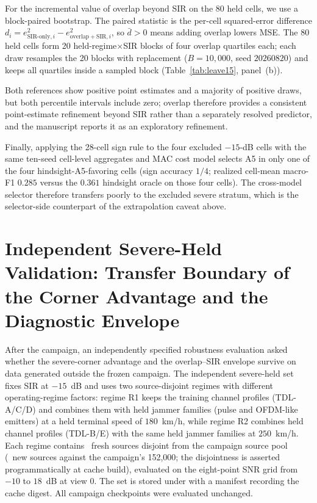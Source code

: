\documentclass[letterpaper,onecolumn,11pt,journal]{IEEEtran}
\begin{document}
For the incremental value of overlap beyond SIR on the 80 held cells, we use
a block-paired bootstrap. The paired statistic is the per-cell
squared-error difference
$d_i=e^2_{\mathrm{SIR\text{-}only},i}-e^2_{\mathrm{overlap+SIR},i}$, so
$\bar d>0$ means adding overlap lowers MSE. The 80 held cells form 20
held-regime$\times$SIR blocks of four overlap quartiles each; each draw
resamples the 20 blocks with replacement ($B=10{,}000$, seed $20260820$)
and keeps all quartiles inside a sampled block
(Table~\ref{tab:leave15}, panel~(b)).

Both references show positive point estimates and a majority of positive
draws, but both percentile intervals include zero; overlap therefore provides
a consistent point-estimate refinement beyond SIR rather than a separately
resolved predictor, and the manuscript reports it as an exploratory
refinement.

Finally, applying the 28-cell sign rule to the four excluded $-15$-dB cells
with the same ten-seed cell-level aggregates and MAC cost model selects A5
in only one of the four hindsight-A5-favoring cells (sign accuracy $1/4$;
realized cell-mean macro-F1 $0.285$ versus the $0.361$ hindsight oracle on
those four cells). The cross-model selector therefore transfers poorly to
the excluded severe stratum, which is the selector-side counterpart of the
extrapolation caveat above.

\section{Independent Severe-Held Validation: Transfer Boundary of the Corner
Advantage and the Diagnostic Envelope}
\label{sec:transfer}
After the campaign, an independently specified robustness evaluation asked
whether the severe-corner advantage and the overlap--SIR
envelope survive on data generated outside the frozen campaign. The
independent severe-held set fixes SIR at $-15$~dB and uses two
\mbox{source-disjoint} regimes with different operating-regime factors: regime R1
keeps the training channel profiles (TDL-A/C/D) and combines them with held
jammer families (pulse and OFDM-like emitters) at a held terminal speed of
$180$~km/h, while regime R2 combines held channel profiles (TDL-B/E) with the
same held jammer families at $250$~km/h. Each regime contains
\SevereHeldSourcesPerRegime\ fresh sources disjoint from the campaign source
pool (\SevereHeldSourcesTotal\ new sources against the campaign's 152,000; the disjointness is
asserted programmatically at cache build), evaluated on the eight-point SNR
grid from $-10$ to $18$~dB at view $0$. The set is stored under
 with a manifest recording the
cache digest. All campaign checkpoints were evaluated unchanged.
\end{document}

